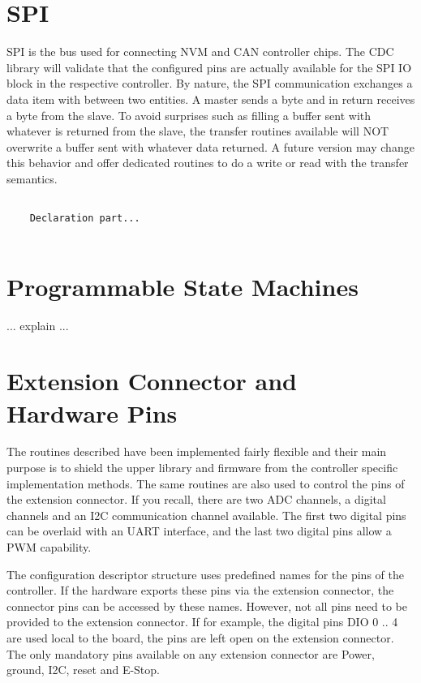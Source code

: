 \section{SPI}

SPI is the bus used for connecting NVM and CAN controller chips. The CDC library will validate that the configured pins are actually available for the SPI IO block in the respective controller. By nature, the SPI communication exchanges a data item with between two entities. A master sends a byte and in return receives a byte from the slave. To avoid surprises such as filling a buffer sent with whatever is returned from the slave, the transfer routines available will NOT overwrite a buffer sent with whatever data returned. A future version may change this behavior and offer dedicated routines to do a write or read with the transfer semantics.

\lstset{language=c++, style=codesnippetstyle}
\begin{lstlisting}
   
    Declaration part...
    
\end{lstlisting}
\FloatBarrier

\section{Programmable State Machines}

... explain ...

\section{Extension Connector and Hardware Pins}

The routines described have been implemented fairly flexible and their main purpose is to shield the upper library and firmware from the controller specific implementation methods. The same routines are also used to control the pins of the extension connector. If you recall, there are two ADC channels, a digital channels and an I2C communication channel available. The first two digital pins can be overlaid with an UART interface, and the last two digital pins allow a PWM capability.

The configuration descriptor structure uses predefined names for the pins of the controller. If the hardware exports these pins via the extension connector, the connector pins can be accessed by these names. However, not all pins need to be provided to the extension connector. If for example, the digital pins DIO 0 .. 4 are used local to the board, the pins are left open on the extension connector. The only mandatory pins available on any extension connector are Power, ground, I2C, reset and E-Stop.

